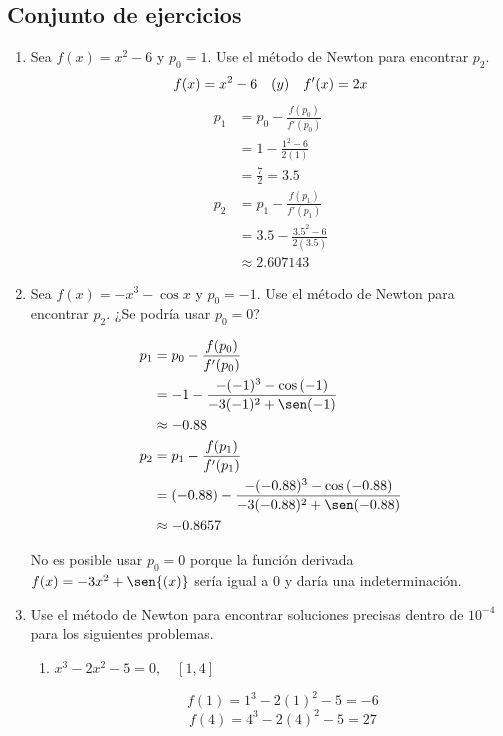 \documentclass[12pt]{article}
\begin{document}
\subsection*{Conjunto de ejercicios}
\begin{enumerate}
    \item Sea \( f(x) = x^2 - 6 \) y \( p_0 = 1 \). Use el método de Newton para encontrar \( p_2 \).
    \[f(x) = x^{2} - 6 \quad \text(y) \quad f'(x) = 2x\]
    \[
    \begin{aligned}
    p_1 &= p_0 - \frac{f(p_0)}{f'(p_0)} \\
        &= 1 - \frac{1^{2} - 6}{2(1)} \\
        &= \frac{7}{2} = 3.5 \\
    p_2 &= p_1 - \frac{f(p_1)}{f'(p_1)} \\
        &= 3.5 - \frac{3.5^{2} - 6}{2(3.5)} \\
        &\approx 2.607143
    \end{aligned}
    \]
    \item Sea \( f(x) = -x^3 - \cos x \) y \( p_0 = -1 \). Use el método de Newton para encontrar \( p_2 \). ¿Se podría usar \( p_0 = 0 \)?

    \[
    \begin{aligned}
    p_1 &= p_0 - \frac{f(p_0)}{f'(p_0)} \\        
        &= -1 - \frac{-(-1)^{3}- \cos{(-1)}}{-3(-1)^{2} + \sen(-1)} \\
        &\approx -0.88 \\
    p_2 &= p_1 - \frac{f(p_1)}{f'(p_1)} \\
        &= (-0.88) - \frac{-(-0.88)^{3} - \cos{(-0.88)}}{-3(-0.88)^{2} + \sen(-0.88)} \\
        &\approx -0.8657
    \end{aligned}
    \]

    No es posible usar \(p_0 = 0\) porque la función derivada \( f(x) = -3x^{2} + \sen{(x)}\) sería igual a 0 y daría una indeterminación.
    
    
    \item Use el método de Newton para encontrar soluciones precisas dentro de \(10^{-4}\) para los siguientes problemas.
    
    \begin{enumerate}
        \item \( x^3 - 2x^2 - 5 = 0, \quad [1,4] \)
        
        \[f(1) = 1^{3} - 2(1)^{2} - 5 = -6\]
        \[f(4) = 4^{3} - 2(4)^{2} - 5 = 27\]


\end{enumerate}
\end{enumerate}
\end{document}
